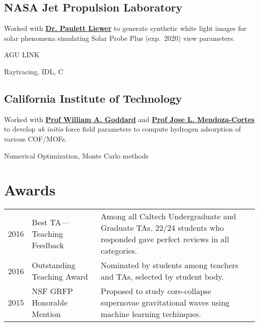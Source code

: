 \documentclass[]{yubo-resume-openfont}
\begin{document}
\begin{minipage}[t]{0.66\textwidth}
\subsection{NASA Jet Propulsion Laboratory}
\begin{tightemize}
    \item Worked with \textbf{\href{TODO}{Dr. Paulett Liewer}} to generate
        synthetic white light images for solar phenomena simulating Solar Probe
        Plus (exp.~2020) view parameters.
    \item AGU LINK %
    \item Raytracing, IDL, C
\end{tightemize}
\sectionsep

\subsection{California Institute of Technology}
\begin{tightemize}
    \item Worked with \textbf{\href{TODO}{Prof William A. Goddard}} and
        \textbf{\href{TODO}{Prof Jose L. Mendoza-Cortes}} to develop \emph{ab
        initio} force field parameters to compute hydrogen adsorption of various
        COF/MOFs.
    \item Numerical Optimization, Monte Carlo methods
\end{tightemize}
\sectionsep


\section{Awards}
\begin{tabular}{p{20pt}p{80pt}p{7.5cm}}
    2016 & Best TA---Teaching Feedback & Among all Caltech Undergraduate and
    Graduate TAs. 22/24 students who responded gave perfect reviews in all
    categories.\\
    2016 & Outstanding Teaching Award & Nominated by students among teachers and
    TAs, selected by student body.\\
    2015 & NSF GRFP Honorable Mention & Proposed to study core-collapse
    supernovae gravitational waves using machine learning techinques.
\end{tabular}
\sectionsep

\end{minipage}
\end{document}
